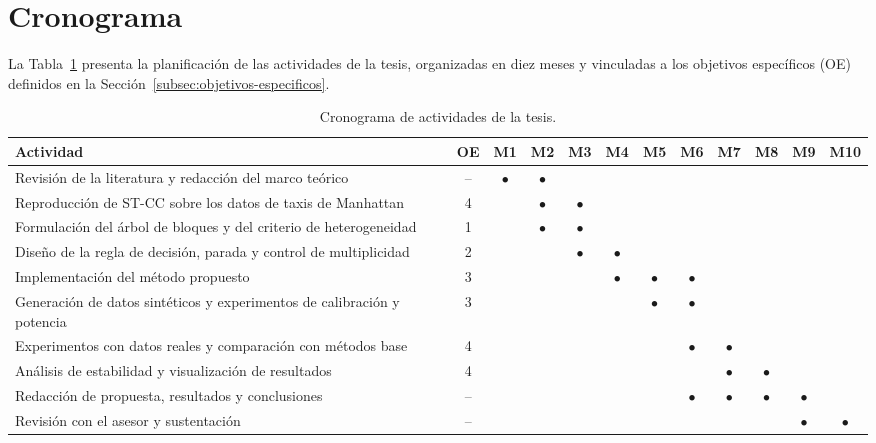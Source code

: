 \section{Cronograma}
\label{sec:cronograma}

La Tabla~\ref{tab:cronograma} presenta la planificación de las actividades
de la tesis, organizadas en diez meses y vinculadas a los objetivos
específicos (OE) definidos en la Sección~\ref{subsec:objetivos-especificos}.

\begin{table}[htbp]
\centering
\small
\setlength{\tabcolsep}{3pt}  %
\begin{tabular}{>{\raggedright\arraybackslash}p{5.4cm} c *{10}{c}}
\hline
\textbf{Actividad} & \textbf{OE} &
\textbf{M1} & \textbf{M2} & \textbf{M3} & \textbf{M4} & \textbf{M5} &
\textbf{M6} & \textbf{M7} & \textbf{M8} & \textbf{M9} & \textbf{M10} \\
\hline
Revisión de la literatura y redacción del marco teórico
    & -- & $\bullet$ & $\bullet$ & & & & & & & & \\
Reproducción de \ac{ST-CC} sobre los datos de taxis de Manhattan
    & 4 & & $\bullet$ & $\bullet$ & & & & & & & \\
Formulación del árbol de bloques y del criterio de heterogeneidad
    & 1 & & $\bullet$ & $\bullet$ & & & & & & & \\
Diseño de la regla de decisión, parada y control de multiplicidad
    & 2 & & & $\bullet$ & $\bullet$ & & & & & & \\
Implementación del método propuesto
    & 3 & & & & $\bullet$ & $\bullet$ & $\bullet$ & & & & \\
Generación de datos sintéticos y experimentos de calibración y potencia
    & 3 & & & & & $\bullet$ & $\bullet$ & & & & \\
Experimentos con datos reales y comparación con métodos base
    & 4 & & & & & & $\bullet$ & $\bullet$ & & & \\
Análisis de estabilidad y visualización de resultados
    & 4 & & & & & & & $\bullet$ & $\bullet$ & & \\
Redacción de propuesta, resultados y conclusiones
    & -- & & & & & & $\bullet$ & $\bullet$ & $\bullet$ & $\bullet$ & \\
Revisión con el asesor y sustentación
    & -- & & & & & & & & & $\bullet$ & $\bullet$ \\
\hline
\end{tabular}
\caption{Cronograma de actividades de la tesis.}
\label{tab:cronograma}
\end{table}